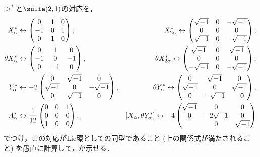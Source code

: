 \begin{pfwn}{}
  $\ge^{*} $と$\sulie(2,1) $の対応を，
  \begin{align*}
    X_{\alpha}^{*} & \leftrightarrow
                     \begin{pmatrix}
                       0 & 1 & 0\\ -1 & 0 & 1\\ 0 & 1 & 0
                     \end{pmatrix},&   X_{2\alpha}^{*}  \leftrightarrow
                     \begin{pmatrix}
                       \sqrt{-1} & 0 & -\sqrt{-1} \\ 0 & 0 & 0\\ \sqrt{-1} & 0 & -\sqrt{-1}
                     \end{pmatrix},\\
    \theta X_{\alpha}^{*} & \leftrightarrow
                     \begin{pmatrix}
                       0 & 1 & 0\\ -1 & 0 & -1\\ 0 & -1 & 0
                     \end{pmatrix},&   \theta X_{2\alpha}^{*}  \leftrightarrow
                     \begin{pmatrix}
                       \sqrt{-1} & 0 & \sqrt{-1} \\ 0 & 0 & 0\\ -\sqrt{-1} & 0 & -\sqrt{-1}
                     \end{pmatrix},\\
    Y_{\alpha}^{*} & \leftrightarrow
                     -2 \begin{pmatrix}
                       0 & \sqrt{-1} & 0\\ \sqrt{-1} & 0 & -\sqrt{-1} \\ 0 & \sqrt{-1} & 0
                     \end{pmatrix},&   \theta Y_{\alpha}^{*}  \leftrightarrow
                     \begin{pmatrix}
                       0 & \sqrt{-1}  & 0 \\ \sqrt{-1} & 0 & \sqrt{-1} \\ 0 & -\sqrt{-1} & -0
                     \end{pmatrix},\\
    A_{\alpha}^{*} & \leftrightarrow
                    \frac{1}{12} \begin{pmatrix}
                       0 & 0 & 1\\ 0 & 0 & 0\\ 1 & 0 & 0
                     \end{pmatrix},&   [X_{\alpha},\theta Y_{\alpha}^{*}] \leftrightarrow
                    -4 \begin{pmatrix}
                       \sqrt{-1} & 0 & 0 \\ 0 & -2\sqrt{-1} & 0\\  & 0 & \sqrt{-1}
                     \end{pmatrix}
  \end{align*}
  でつけ，この対応がLie環としての同型であること (上の関係式が満たされること) を愚直に計算して，が示せる．
  
\end{pfwn}

